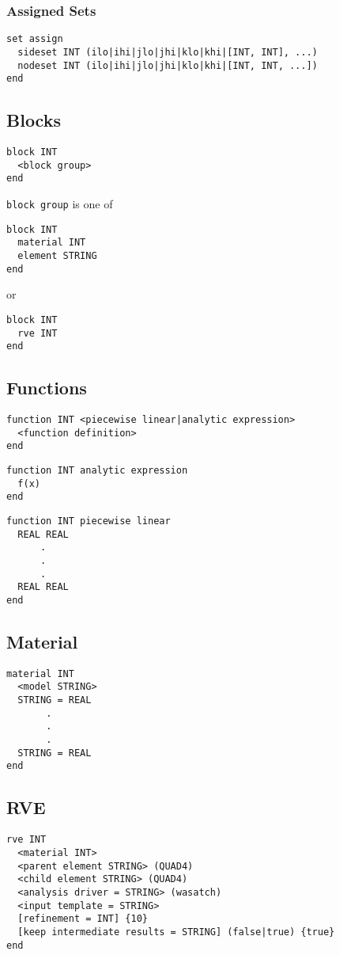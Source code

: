 \documentclass[10pt]{article}
\begin{document}
\subsubsection{Assigned Sets}
\begin{verbatim}
set assign
  sideset INT (ilo|ihi|jlo|jhi|klo|khi|[INT, INT], ...)
  nodeset INT (ilo|ihi|jlo|jhi|klo|khi|[INT, INT, ...])
end
\end{verbatim}

\subsection{Blocks}
\begin{verbatim}
block INT
  <block group>
end
\end{verbatim}
\texttt{block group} is one of
\begin{verbatim}
block INT
  material INT
  element STRING
end
\end{verbatim}
or
\begin{verbatim}
block INT
  rve INT
end
\end{verbatim}

\subsection{Functions}
\begin{verbatim}
function INT <piecewise linear|analytic expression>
  <function definition>
end
\end{verbatim}
\begin{verbatim}
function INT analytic expression
  f(x)
end
\end{verbatim}
\begin{verbatim}
function INT piecewise linear
  REAL REAL
      .
      .
      .
  REAL REAL
end
\end{verbatim}

\subsection{Material}
\begin{verbatim}
material INT
  <model STRING>
  STRING = REAL
       .
       .
       .
  STRING = REAL
end
\end{verbatim}

\subsection{RVE}
\begin{verbatim}
rve INT
  <material INT>
  <parent element STRING> (QUAD4)
  <child element STRING> (QUAD4)
  <analysis driver = STRING> (wasatch)
  <input template = STRING>
  [refinement = INT] {10}
  [keep intermediate results = STRING] (false|true) {true}
end
\end{verbatim}
\end{document}
